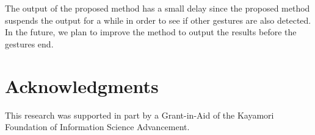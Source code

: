 \documentclass{sigchi-ext}
\begin{document}

        The output of the proposed method has a small delay since the proposed method suspends the output for a while in order to see if other gestures are also detected. In the future, we plan to improve the method to output the results before the gestures end.
        
        \section*{Acknowledgments}
        This research was supported in part by a Grant-in-Aid of the Kayamori Foundation of Information Science Advancement.

        \newpage
\end{document}

